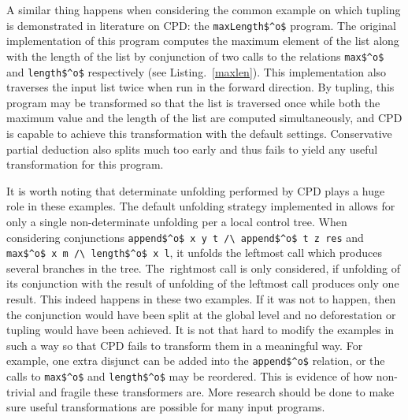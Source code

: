 A similar thing happens when considering the common example on which tupling is demonstrated in literature on CPD: the \lstinline{maxLength$^o$} program.
The original implementation of this program computes the maximum element of the list along with the length of the list by conjunction of two calls to the relations \lstinline{max$^o$} and \lstinline{length$^o$} respectively (see Listing.~\ref{maxlen}).
This implementation also traverses the input list twice when run in the forward direction.
By tupling, this program may be transformed so that the list is traversed once while both the maximum value and the length of the list are computed simultaneously, and CPD is capable to achieve this transformation with the default settings.
Conservative partial deduction also splits much too early and thus fails to yield any useful transformation for this program.

It is worth noting that determinate unfolding performed by CPD plays a huge role in these examples.
The default unfolding strategy implemented in \ecce allows for only a single non-determinate unfolding per a local control tree.
When considering conjunctions \lstinline{append$^o$ x y t /\ append$^o$ t z res} and \lstinline{max$^o$ x m /\ length$^o$ x l}, it unfolds the leftmost call which produces several branches in the tree.
The~rightmost call is only considered, if unfolding of its conjunction with the result of unfolding of the leftmost call produces only one result.
This indeed happens in these two examples.
If it was not to happen, then the conjunction would have been split at the global level and no deforestation or tupling would have been achieved.
It is not that hard to modify the examples in such a way so that CPD fails to transform them in a meaningful way.
For example, one extra disjunct can be added into the \lstinline{append$^o$} relation, or the calls to \lstinline{max$^o$} and \lstinline{length$^o$} may be reordered.
This is evidence of how non-trivial and fragile these transformers are.
More research should be done to make sure useful transformations are possible for many input programs.


